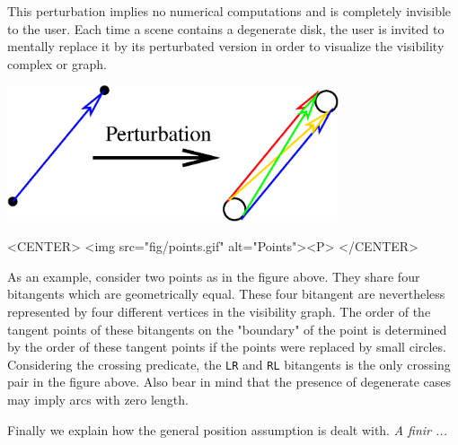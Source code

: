 This perturbation implies no numerical computations and is completely
invisible to the user. Each time a scene contains a degenerate disk, the user
is invited to mentally replace it by its perturbated version in order to
visualize the visibility complex or graph. 

\begin{ccTexOnly}
    \begin{center}
	\includegraphics[height=4cm]{fig/points.eps}%
    \end{center}
\end{ccTexOnly}

\begin{ccHtmlOnly}
    <CENTER>
        <img src="fig/points.gif" alt="Points"><P>
    </CENTER>
\end{ccHtmlOnly}

As an example, consider two points as in the figure above. They share four
bitangents which are geometrically equal. These four bitangent are nevertheless
represented by four different vertices in the visibility graph. The order of the
tangent points of these bitangents on the "boundary" of the point is determined
by the order of these tangent points if the points were replaced by small
circles. Considering the crossing predicate, the \texttt{LR} and \texttt{RL}
bitangents is the only crossing pair in the figure above.  Also bear in mind
that the presence of degenerate cases may imply arcs with zero length.

Finally we explain how the general position assumption is dealt with.
\emph{A finir ...}

